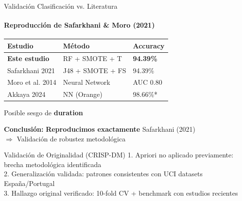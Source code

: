 \documentclass[10pt]{beamer}
\begin{document}
\begin{frame}{Validación Clasificación vs. Literatura}
\framesubtitle{Reproducción de Safarkhani \& Moro (2021)}

\begin{table}
\centering
\small
\begin{tabular}{lll}
\toprule
\textbf{Estudio} & \textbf{Método} & \textbf{Accuracy} \\
\midrule
\textbf{Este estudio} & RF + SMOTE + T & \textbf{94.39\%} \\
Safarkhani 2021 & J48 + SMOTE + FS & 94.39\% \\
Moro et al. 2014 & Neural Network & AUC 0.80 \\
Akkaya 2024 & NN (Orange) & 98.66\%* \\
\bottomrule
\end{tabular}
\end{table}

\vspace{0.1cm}
{\tiny *Posible sesgo de \textbf{duration}}

\vspace{0.2cm}
\textbf{Conclusión:} \textcolor{mGreen}{\textbf{Reproducimos exactamente}} Safarkhani (2021)\\
$\Rightarrow$ Validación de robustez metodológica

\vspace{0.2cm}
\begin{alertblock}{Validación de Originalidad (CRISP-DM)}
\small
1. Apriori no aplicado previamente: brecha metodológica identificada\\ 2. Generalización validada: patrones consistentes con UCI datasets España/Portugal\\
3. Hallazgo original verificado: 10-fold CV + benchmark con estudios recientes
\end{alertblock}
\end{frame}
\end{document}
